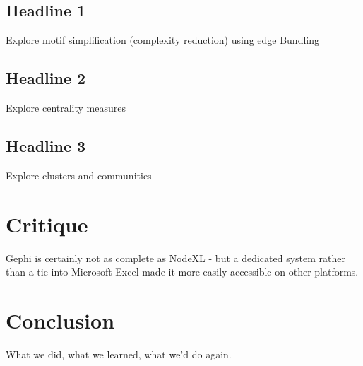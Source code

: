 \documentclass[11pt,letterpaper]{article}
\begin{document}
\subsection*{Headline 1}

Explore motif simplification (complexity reduction) using edge Bundling


\subsection*{Headline 2}

Explore centrality measures

\subsection*{Headline 3}

Explore clusters and communities

\section*{Critique}

Gephi is certainly not as complete as NodeXL - but a dedicated system rather than a tie into Microsoft Excel made it more easily accessible on other platforms.

\section*{Conclusion}

What we did, what we learned, what we'd do again.



\end{document}
